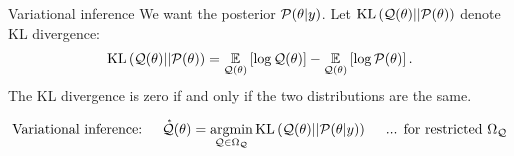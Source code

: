 \documentclass[8pt]{beamer}\usepackage[]{graphicx}\usepackage[]{color}
\begin{document}

\begin{frame}[t]{Variational inference \citep{blei:2016:variational}}
%
We want the posterior $\mathcal{P}(\theta \vert y)$.  Let $\mathrm{KL}\left(\mathcal{Q}(\theta) || \mathcal{P}(\theta)\right)$ denote KL divergence:
%
\begin{align*}
    \mathrm{KL}\left(\mathcal{Q}(\theta) || \mathcal{P}(\theta)\right) = \underset{\mathcal{Q}(\theta)}{\mathbb{E}}\left[\log \mathcal{Q}(\theta)\right] - \underset{\mathcal{Q}(\theta)}{\mathbb{E}}\left[\log \mathcal{P}(\theta)\right].
\end{align*}
%
The KL divergence is zero if and only if the two distributions are the same.

\pause

%
\begin{align*}
%
\textrm{Variational inference: }&& \qstar(\theta) &= \argmin_{\q \in \qdom} \kl{\q(\theta)}{\post}
\quad\textrm{ ... for restricted }\qdom\\
%
\end{align*}
%






\end{frame}
\end{document}
